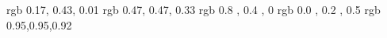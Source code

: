 


\definecolor{arduinoGreen}    {rgb} {0.17, 0.43, 0.01}
\definecolor{arduinoGrey}     {rgb} {0.47, 0.47, 0.33}
\definecolor{arduinoOrange}   {rgb} {0.8 , 0.4 , 0}
\definecolor{arduinoDarkBlue} {rgb} {0.0 , 0.2 , 0.5 }
\definecolor{backcolour} {rgb} {0.95,0.95,0.92}


